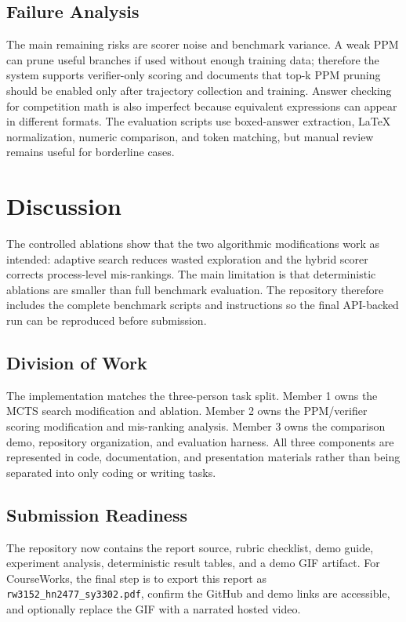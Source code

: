 \documentclass[sigconf,nonacm]{acmart}
\begin{document}
\subsection{Failure Analysis}

The main remaining risks are scorer noise and benchmark variance. A weak PPM
can prune useful branches if used without enough training data; therefore the
system supports verifier-only scoring and documents that top-k PPM pruning
should be enabled only after trajectory collection and training. Answer checking
for competition math is also imperfect because equivalent expressions can appear
in different formats. The evaluation scripts use boxed-answer extraction, LaTeX
normalization, numeric comparison, and token matching, but manual review remains
useful for borderline cases.

\section{Discussion}

The controlled ablations show that the two algorithmic modifications work as
intended: adaptive search reduces wasted exploration and the hybrid scorer
corrects process-level mis-rankings. The main limitation is that deterministic
ablations are smaller than full benchmark evaluation. The repository therefore
includes the complete benchmark scripts and instructions so the final API-backed
run can be reproduced before submission.

\subsection{Division of Work}

The implementation matches the three-person task split. Member 1 owns the MCTS
search modification and ablation. Member 2 owns the PPM/verifier scoring
modification and mis-ranking analysis. Member 3 owns the comparison demo,
repository organization, and evaluation harness. All three components are
represented in code, documentation, and presentation materials rather than being
separated into only coding or writing tasks.

\subsection{Submission Readiness}

The repository now contains the report source, rubric checklist, demo guide,
experiment analysis, deterministic result tables, and a demo GIF artifact. For
CourseWorks, the final step is to export this report as
\texttt{rw3152\_hn2477\_sy3302.pdf}, confirm the GitHub and demo links are
accessible, and optionally replace the GIF with a narrated hosted video.
\end{document}
